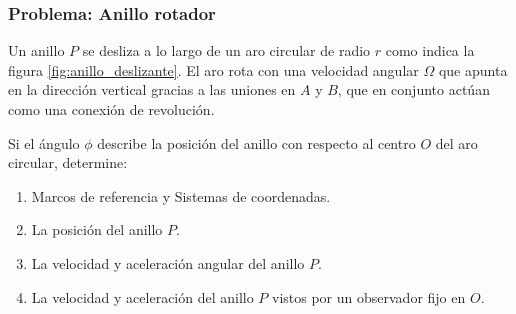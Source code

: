 \subsubsection{Problema: Anillo rotador}
Un anillo \( P \) se desliza a lo largo de un aro circular de radio \( r \) como indica la figura \ref{fig:anillo_deslizante}. El aro rota con una velocidad angular \( \Omega \) que apunta en la dirección vertical gracias a las uniones en \( A \) y \( B \), que en conjunto actúan como una conexión de revolución.

Si el ángulo \( \phi \) describe la posición del anillo con respecto al centro \( O \) del aro circular, determine:

\begin{enumerate}
    
    \item Marcos de referencia y Sistemas de coordenadas.
    \item La posición del anillo \( P \).
    \item La velocidad y aceleración angular del anillo \( P \).
    \item La velocidad y aceleración del anillo \( P \) vistos por un observador fijo en \( O \).
\end{enumerate}

